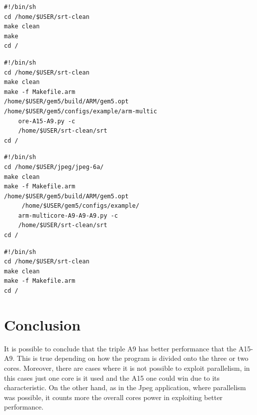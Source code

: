\documentclass[journal]{IEEEtran}
\begin{document}
\begin{lstlisting}
#!/bin/sh
cd /home/$USER/srt-clean
make clean
make
cd /
\end{lstlisting}

\begin{lstlisting}
#!/bin/sh
cd /home/$USER/srt-clean
make clean
make -f Makefile.arm
/home/$USER/gem5/build/ARM/gem5.opt
/home/$USER/gem5/configs/example/arm-multic
	ore-A15-A9.py -c
	/home/$USER/srt-clean/srt
cd /
\end{lstlisting}

\begin{lstlisting}
#!/bin/sh
cd /home/$USER/jpeg/jpeg-6a/
make clean
make -f Makefile.arm
/home/$USER/gem5/build/ARM/gem5.opt
	 /home/$USER/gem5/configs/example/
	arm-multicore-A9-A9-A9.py -c 
	/home/$USER/srt-clean/srt
cd /
\end{lstlisting}


\begin{lstlisting}
#!/bin/sh
cd /home/$USER/srt-clean
make clean
make -f Makefile.arm
cd /
\end{lstlisting}



\section{Conclusion}
It is possible to conclude that the triple A9 has better performance that the A15-A9. This is true depending on how the program is divided onto the three or two cores. Moreover, there are cases where it is not possible to exploit parallelism, in this cases just one core is it used and the A15 one could win due to its characteristic. On the other hand, as in the Jpeg application, where parallelism was possible, it counts more the overall cores power in exploiting better performance. 
\end{document}
